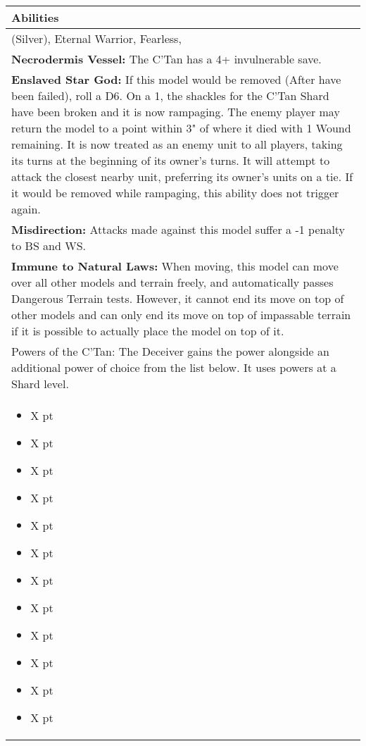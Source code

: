 \noindent
\begin{tabular}{||m{532pt}||}
	\hline
	Abilities \\
	\hline
	\quickref{Awakening Protocols} (Silver), Eternal Warrior, Fearless, \quickref{Reanimation Protocols} \\
	\textbf{Necrodermis Vessel:} The C'Tan has a 4+ invulnerable save. \\
	\textbf{Enslaved Star God:} If this model would be removed (After \quickref{Reanimation Protocols} have been failed), roll a D6. On a 1, the shackles for the C'Tan Shard have been broken and it is now rampaging. The enemy player may return the model to a point within 3" of where it died with 1 Wound remaining. It is now treated as an enemy unit to all players, taking its turns at the beginning of its owner's turns. It will attempt to attack the closest nearby unit, preferring its owner's units on a tie. If it would be removed while rampaging, this ability does not trigger again. \\
	\textbf{Misdirection:} Attacks made against this model suffer a -1 penalty to BS and WS. \\
	\textbf{Immune to Natural Laws:} When moving, this model can move over all other models and terrain 	freely, and automatically passes Dangerous Terrain tests. However, it 	cannot end its move on top of other models and can only end its move on top of impassable terrain if it is possible to actually place the model on top of it. \\
	Powers of the C'Tan: The Deceiver gains the \quickref{Grand Illusion} power alongside an additional power of choice from the list below. It uses powers at a Shard level. \\
	\begin{itemize}
		\item \quickref{Antimatter Meteor} \hrulefill X pt
		\item \quickref{Cosmic Fire} \hrulefill X pt
		\item \quickref{Entropic Touch} \hrulefill X pt
		\item \quickref{Moulder of Worlds} \hrulefill X pt
		\item \quickref{Pyreshards} \hrulefill X pt
		\item \quickref{Sentient Singularity} \hrulefill X pt
		\item \quickref{Seismic Assault} \hrulefill X pt
		\item \quickref{Sky of Falling Stars} \hrulefill X pt
		\item \quickref{Swarm of Spirit Dust} \hrulefill X pt
		\item \quickref{Time's Arrow} \hrulefill X pt
		\item \quickref{Transdimensional Thunderbolt} \hrulefill X pt
		\item \quickref{Withering Worldscape} \hrulefill X pt
	\end{itemize} \\
	\hline
\end{tabular}




